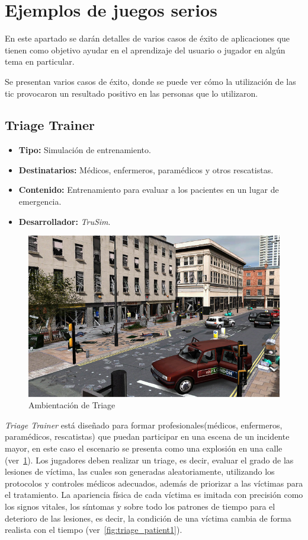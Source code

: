 \section{Ejemplos de juegos serios}

En este apartado se darán detalles de varios casos de éxito de aplicaciones que
tienen como objetivo ayudar en el aprendizaje del usuario o jugador en algún
tema en particular.

Se presentan varios casos de éxito, donde se puede ver cómo la utilización de
las \Gls{tic} provocaron un resultado positivo en las personas que lo
utilizaron.

\subsection{Triage Trainer}

\begin{itemize}
\item \textbf{Tipo:} Simulación de entrenamiento.
\item \textbf{Destinatarios:} Médicos, enfermeros, paramédicos y otros
    rescatistas.
\item \textbf{Contenido:} Entrenamiento para evaluar a los pacientes en un lugar de
  emergencia.
\item \textbf{Desarrollador:} \emph{TruSim}.
\end{itemize}

\begin{figure}[ht!] 
\centering 
\includegraphics[scale=0.5]{tics/images/triage.png}
\caption{Ambientación de Triage}
\label{fig:triage}
\end{figure}

\emph{Triage Trainer} está diseñado para formar profesionales(médicos, enfermeros, 
paramédicos, rescatistas) que puedan participar en una escena de un incidente 
mayor, en este caso el escenario se presenta como una explosión en una calle 
(ver~\ref{fig:triage}). Los jugadores deben realizar un triage, es decir, evaluar 
el grado de las lesiones de víctima, las cuales son generadas aleatoriamente, 
utilizando los protocolos y controles médicos adecuados, además de priorizar a las 
víctimas para el tratamiento. La apariencia física de cada víctima es imitada con 
precisión como los signos vitales, los síntomas y sobre todo los patrones de tiempo 
para el deterioro de las lesiones, es decir, la condición de una víctima cambia de 
forma realista con el tiempo (ver~\ref{fig:triage_patient1}).

